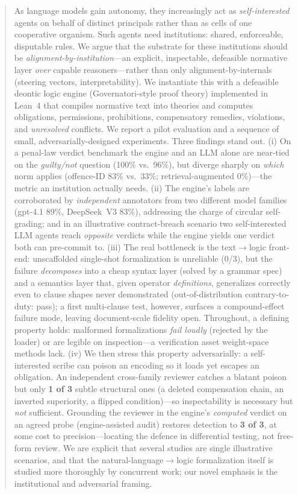 
\begin{abstract}
As language models gain autonomy, they increasingly act as \emph{self-interested}
agents on behalf of distinct principals rather than as cells of one cooperative
organism. Such agents need institutions: shared, enforceable, disputable rules.
We argue that the substrate for these institutions should be \emph{alignment-by-institution}---an
explicit, inspectable, defeasible normative layer \emph{over} capable reasoners---rather
than only alignment-by-internals (steering vectors, interpretability). We
instantiate this with a defeasible deontic logic engine (Governatori-style proof
theory) implemented in Lean~4 that compiles normative text into theories and
computes obligations, permissions, prohibitions, compensatory remedies, violations,
and \emph{unresolved} conflicts. We report a pilot evaluation and a sequence of
small, adversarially-designed experiments. Three findings stand out. (i) On a
penal-law verdict benchmark the engine and an LLM alone are near-tied on the
\emph{guilty/not} question (100\% vs.\ 96\%), but diverge sharply on \emph{which}
norm applies (offence-ID 83\% vs.\ 33\%; retrieval-augmented 0\%)---the metric an
institution actually needs. (ii) The engine's labels are corroborated by
\emph{independent} annotators from two different model families (gpt-4.1 89\%,
DeepSeek~V3 83\%), addressing the charge of circular self-grading; and in an
illustrative contract-breach scenario two self-interested LLM
agents reach \emph{opposite} verdicts while the engine yields one verdict both can
pre-commit to. (iii) The real bottleneck is the text$\rightarrow$logic
front-end: unscaffolded single-shot formalization is unreliable (0/3), but the
failure \emph{decomposes} into a cheap syntax layer (solved by a grammar spec)
and a semantics layer that, given operator \emph{definitions}, generalizes
correctly even to clause shapes never demonstrated (out-of-distribution
contrary-to-duty: pass); a first multi-clause test, however, surfaces a
compound-effect failure mode, leaving document-scale fidelity open. Throughout, a defining property holds: malformed
formalizations \emph{fail loudly} (rejected by the loader) or are legible on
inspection---a verification asset weight-space methods lack. (iv) We then stress this
property adversarially: a self-interested scribe can poison an encoding so it loads yet
escapes an obligation. An independent cross-family reviewer catches a blatant poison but
only \textbf{1 of 3} subtle structural ones (a deleted compensation chain, an inverted
superiority, a flipped condition)---so inspectability is necessary but \emph{not} sufficient.
Grounding the reviewer in the engine's \emph{computed} verdict on an agreed probe (engine-assisted
audit) restores detection to \textbf{3 of 3}, at some cost to precision---locating the defence in
differential testing, not free-form review. We are explicit that
several studies are single illustrative scenarios, and that the natural-language$\rightarrow$logic
formalization itself is studied more thoroughly by concurrent work; our novel emphasis is the
institutional and adversarial framing.
\end{abstract}

